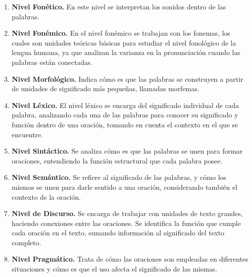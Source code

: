\begin{enumerate}[label=\alph*.]
    \item \textbf{Nivel Fonético.} En este nivel se interpretan los sonidos dentro de las palabras.
    \item \textbf{Nivel Fonémico.} En el nivel fonémico se trabajan con los fonemas, los cuales son unidades teóricas básicas para estudiar el nivel fonológico de la lengua humana, ya que analizan la varianza en la pronunciación cuando las palabras están conectadas.
    \item \textbf{Nivel Morfológico.} Indica cómo es que las palabras se construyen a partir de unidades de significado más pequeñas, llamadas morfemas.
    \item \textbf{Nivel Léxico.} El nivel léxico se encarga del significado individual de cada palabra, analizando cada una de las palabras para conocer su significado y función dentro de una oración, tomando en cuenta el contexto en el que se encuentre.
    \item \textbf{Nivel Sintáctico.} Se analiza cómo es que las palabras se unen para formar oraciones, entendiendo la función estructural que cada palabra posee.
    \item \textbf{Nivel Semántico.} Se refiere al significado de las palabras, y cómo los mismos se unen para darle sentido a una oración, considerando también el contexto de la oración.
    \item \textbf{Nivel de Discurso.} Se encarga de trabajar con unidades de texto grandes, haciendo conexiones entre las oraciones. Se identifica la función que cumple cada oración en el texto, sumando información al significado del texto completo.
    \item \textbf{Nivel Pragmático.} Trata de cómo las oraciones son empleadas en diferentes situaciones y cómo es que el uso afecta el significado de las mismas.
\end{enumerate}

